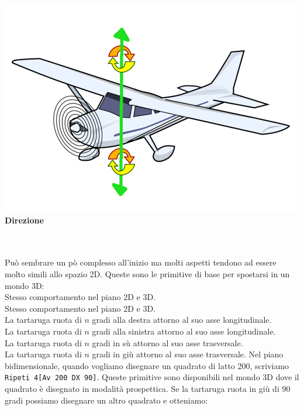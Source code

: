\begin{minipage}{5.5cm}
	\begin{center}
		\includegraphics*[scale=0.3]{pics/plane-heading.png}
		\textbf{Direzione}
	\end{center}
	\end{minipage}\\ \\
	Può sembrare un pò complesso all'inizio ma molti aspetti tendono ad essere molto simili allo spazio 2D. Queste sono le primitive di base per spostarsi in un mondo 3D:\\
	Stesso comportamento nel piano 2D e 3D.\\
	Stesso comportamento nel piano 2D e 3D.\\
	La tartaruga ruota di $n$ gradi alla destra attorno al suo asse longitudinale.\\
	La tartaruga ruota di $n$ gradi alla sinistra attorno al suo asse longitudinale.\\
	La tartaruga ruota di $n$ gradi in sù attorno al suo asse trasversale.\\
	La tartaruga ruota di $n$ gradi in giù attorno al suo asse trasversale. Nel piano bidimensionale, quando vogliamo disegnare un quadrato di latto 200, scriviamo \lstinline!Ripeti 4[Av 200 DX 90]!. Queste primitive sono disponibili nel mondo 3D dove il quadrato è disegnato in modalità prospettica. Se la tartaruga ruota in giù di $90$ gradi possiamo disegnare un altro quadrato e otteniamo: \\
